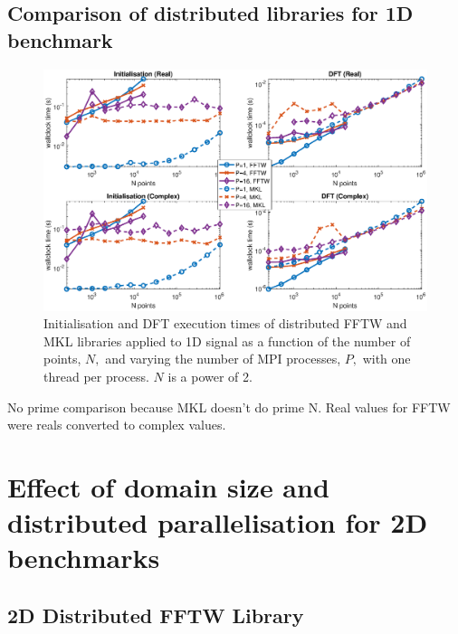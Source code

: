 \documentclass[a4paper]{article}
\begin{document}
\subsection{Comparison of distributed libraries for 1D benchmark}\label{Sec:1DDistComp}


\begin{figure}[htb]
    \centering
    \includegraphics[width=0.9\linewidth]{../results/fftw_mkl_2_1d_mpi.eps}
  \caption{Initialisation and DFT execution times of distributed FFTW and MKL libraries applied to 1D signal as a function of the
    number of points, $N,$ and varying the number of MPI processes, $P,$ with one thread per process. $N$ is a power of 2.}
  \label{1DDistFFTWMKL2}
\end{figure}


No prime comparison because MKL doesn't do prime N. Real values for FFTW were reals converted to complex values.


\section{Effect of domain size and distributed parallelisation for 2D benchmarks}\label{Sec:2DDistr}

\subsection{2D Distributed FFTW Library}\label{Sec:2DDistFFTW}
\end{document}
